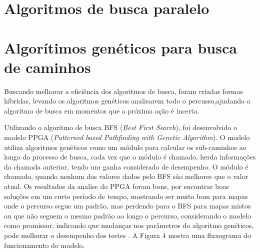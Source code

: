 \begin{minipage}{\linewidth}
\end{minipage}



\section{Algoritmos de busca paralelo}

\section{Algorítimos genéticos para busca de caminhos}
Buscando melhorar a eficiência dos algoritmos de busca, foram criadas formas híbridas, levando os algoritmos genéticos analisarem todo o percusso,ajudando o algoritmo de busca em momentos que a próxima ação é incerta.

Utilizando o algoritmo de busca BFS (\textit{Best First Search}), foi desenvolvido o modelo PPGA (\textit{Patterned based Pathfinding with Genetic Algorithm}). O modelo utiliza algoritmos genéticos como um módulo para calcular os sub-caminhos ao longo do processo de busca, cada vez que o módulo é chamado, herda informações da chamada anterior, tendo um ganha considerado de desempenho. O módulo é chamado, quando nenhum dos valores dados pelo BFS são melhores que o valor atual. Os resultados da analise do PPGA foram bons, por encontrar boas soluções em um curto período de tempo, mostrando ser muito bom para mapas onde o percurso segue um padrão, mas perdendo para o BFS para mapas mistos ou que não seguem o mesmo padrão ao longo o percurso, considerando o modelo como promissor, indicando que mudanças nos parâmetros do algoritmo genéticos, pode melhorar o desempenho dos testes \cite{Ulysses}. A Figura 4 mostra uma fluxograma do funcionamento do modelo.

